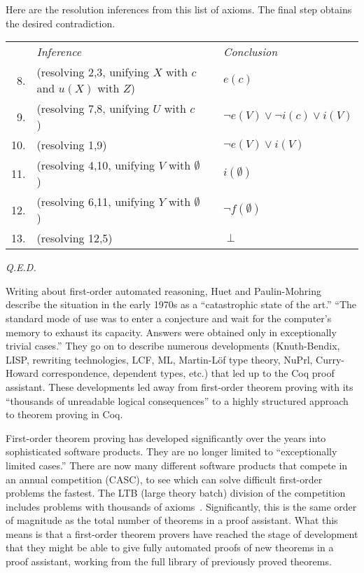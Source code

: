 \documentclass{llncs}
\begin{document}
{{Here are the resolution inferences from this list of axioms. The final step obtains the
desired contradiction. 

\bigskip
\begin{tabular}{lll}
{\it }&{\it Inference}&{\it Conclusion}\\
~8.&(resolving 2,3, unifying $X$ with $c$ and $u(X)$ with $Z$)~~~~~&$e(c)$\\
~9.&(resolving 7,8, unifying $U$ with $c$)~~~&$\lnot e(V) \lor \lnot i(c) \lor i(V)$\\
10.&(resolving 1,9)~~~&$\lnot e(V) \lor  i(V)$\\
11.&(resolving 4,10, unifying $V$ with $\emptyset$)~~~&$i(\emptyset)$\\
12.&(resolving 6,11, unifying $Y$ with $\emptyset$)~~~&$\lnot f(\emptyset)$\\
13.&(resolving 12,5)~~~&$\perp$\\
\end{tabular}
\bigskip
{{\it Q.E.D.}}

}}

\newpage


Writing about first-order automated reasoning, Huet and Paulin-Mohring
\cite{Coq} describe the situation in the early 1970s as a
``catastrophic state of the art.''  ``The standard mode of use was to
enter a conjecture and wait for the computer's memory to exhaust its
capacity.  Answers were obtained only in exceptionally trivial
cases.'' %
They go on to describe numerous developments (Knuth-Bendix, LISP,
rewriting technologies, LCF, ML, Martin-L\"of type theory, NuPrl,
Curry-Howard correspondence, dependent types, etc.) that led up to the
Coq proof assistant.  These developments led away from first-order
theorem proving with its ``thousands of unreadable logical
consequences'' to a highly structured approach to theorem proving in Coq.


First-order theorem proving has developed significantly over the years
into sophisticated software products.  They are no longer limited to
``exceptionally limited cases.''  There are now many different
software products that compete in an annual competition (CASC), to see
which can solve difficult first-order problems the fastest.  The LTB
(large theory batch) division of the competition includes problems
with thousands of axioms~\cite{PSST}.  Significantly, this is the same order of
magnitude as the total number of theorems in a proof assistant.  What
this means is that a first-order theorem provers have reached the
stage of development that they might be able to give fully automated
proofs of new theorems in a proof assistant, working from the full
library of previously proved theorems.
\end{document}
